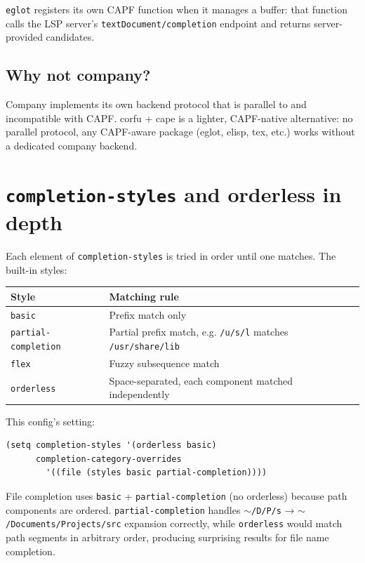 \texttt{eglot} registers its own CAPF function when it manages a buffer: that function calls the LSP server's \texttt{textDocument/completion} endpoint and returns server-provided candidates.

\subsection{Why not company?}\label{why-not-company}

Company implements its own backend protocol that is parallel to and incompatible with CAPF. corfu + cape is a lighter, CAPF-native alternative: no parallel protocol, any CAPF-aware package (eglot, elisp, tex, etc.) works without a dedicated company backend.

\section{\texttt{completion-styles} and orderless in depth}\label{completion-styles-and-orderless-in-depth}

Each element of \texttt{completion-styles} is tried in order until one matches. The built-in styles:

\begin{longtable}[]{@{}ll@{}}
\toprule
Style & Matching rule \\
\midrule
\texttt{basic} & Prefix match only \\
\texttt{partial-completion} & Partial prefix match, e.g. \texttt{/u/s/l} matches \texttt{/usr/share/lib} \\
\texttt{flex} & Fuzzy subsequence match \\
\texttt{orderless} & Space-separated, each component matched independently \\
\bottomrule
\end{longtable}

This config's setting:

\begin{verbatim}
(setq completion-styles '(orderless basic)
      completion-category-overrides
        '((file (styles basic partial-completion))))
\end{verbatim}

File completion uses \texttt{basic} + \texttt{partial-completion} (no orderless) because path components are ordered. \texttt{partial-completion} handles \texttt{$\sim$/D/P/s} → \texttt{$\sim$/Documents/Projects/src} expansion correctly, while \texttt{orderless} would match path segments in arbitrary order, producing surprising results for file name completion.


